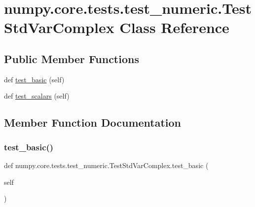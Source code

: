 \hypertarget{classnumpy_1_1core_1_1tests_1_1test__numeric_1_1TestStdVarComplex}{}\section{numpy.\+core.\+tests.\+test\+\_\+numeric.\+Test\+Std\+Var\+Complex Class Reference}
\label{classnumpy_1_1core_1_1tests_1_1test__numeric_1_1TestStdVarComplex}
\subsection*{Public Member Functions}
\begin{DoxyCompactItemize}
\item 
def \hyperlink{classnumpy_1_1core_1_1tests_1_1test__numeric_1_1TestStdVarComplex_a39878cf6051498d1c92b33fe5a0cbdd9}{test\+\_\+basic} (self)
\item 
def \hyperlink{classnumpy_1_1core_1_1tests_1_1test__numeric_1_1TestStdVarComplex_a199e7de5d7021bbf42f415b26767bccb}{test\+\_\+scalars} (self)
\end{DoxyCompactItemize}


\subsection{Member Function Documentation}
\mbox{\label{classnumpy_1_1core_1_1tests_1_1test__numeric_1_1TestStdVarComplex_a39878cf6051498d1c92b33fe5a0cbdd9}} 
\subsubsection{\texorpdfstring{test\+\_\+basic()}{test\_basic()}}
{\footnotesize\ttfamily def numpy.\+core.\+tests.\+test\+\_\+numeric.\+Test\+Std\+Var\+Complex.\+test\+\_\+basic (\begin{DoxyParamCaption}\item[{}]{self }\end{DoxyParamCaption})}

